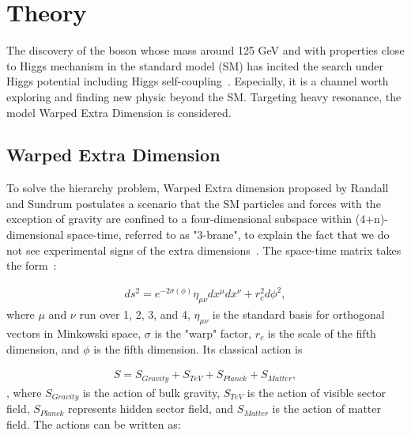 \section{Theory}

The discovery of the boson whose mass around 125 GeV and with properties close to Higgs mechanism in the standard model (SM) has incited the search under Higgs potential including Higgs self-coupling~\citep{jetarea_fastjet_pu,HiggsdiscoveryAtlas}. Especially, it is a channel worth exploring and finding new physic beyond the SM. 
Targeting heavy resonance, the model Warped Extra Dimension is considered. 

\subsection{Warped Extra Dimension} 

To solve the hierarchy problem, Warped Extra dimension proposed by Randall and Sundrum postulates a scenario that the SM particles and forces with the exception of gravity are confined to a four-dimensional subspace within (4+n)-dimensional space-time, referred to as "3-brane", 
to explain the fact that we do not see experimental signs of the extra dimensions~\citep{Randall:1999ee}.  The space-time matrix takes the form~\citep{Oliveira:2014kla}:

\begin{equation} 
\begin{split}
ds^2 = e^{-2\sigma(\phi)}\eta_{\mu\nu}dx^{\mu}dx^{\nu} + r^2_{c}d\phi^2, 
\end{split}
\end{equation}
where $\mu$ and $\nu$ run over 1, 2, 3, and 4, $\eta_{\mu\nu}$ is the standard basis for orthogonal vectors in Minkowski space, $\sigma$ is the "warp" factor, $r_{c}$ is the scale of the fifth dimension, and $\phi$ is the fifth dimension. Its classical action is 

\begin{equation}
\begin{split}
S = S_{Gravity}+S_{TeV}+S_{Planck}+S_{Matter},
\end{split}
\end{equation},
where $S_{Gravity}$ is the action of bulk gravity, $S_{TeV}$ is the action of visible sector field, $S_{Planck}$ represents hidden sector field, and $S_{Matter}$ is the action of matter field. The actions can be written as:

